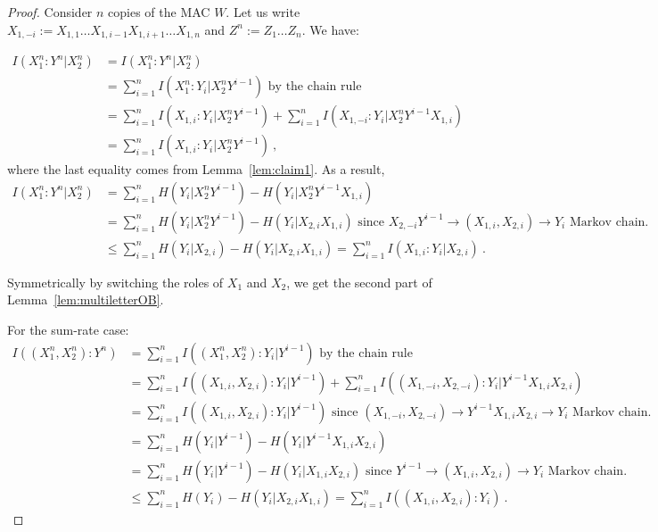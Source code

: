 \documentclass[11pt]{article}
\theoremstyle{definition}
\theoremstyle{remark}
\begin{document}
  \begin{proof}
    Consider $n$ copies of the MAC $W$. Let us write $X_{1,-i} := X_{1,1} \ldots X_{1,i-1} X_{1,i+1} \ldots X_{1,n}$ and $Z^n := Z_1 \ldots Z_n$. We have:

    \begin{equation}
      \begin{aligned}
        I(X_1^n:Y^n|X_2^n) &= I(X_1^n:Y^n|X_2^n)\\
        &= \sum_{i=1}^n I(X_1^n:Y_i|X_2^nY^{i-1}) \text{ by the chain rule}\\
        &= \sum_{i=1}^n I(X_{1,i}:Y_i|X_2^nY^{i-1}) + \sum_{i=1}^n I(X_{1,-i}:Y_i|X_2^nY^{i-1}X_{1,i})\\
        &= \sum_{i=1}^n I(X_{1,i}:Y_i|X_2^nY^{i-1}) \ ,
        \end{aligned}
     \end{equation}
     where the last equality comes from Lemma~\ref{lem:claim1}. As a result,
     \begin{equation}
     \begin{aligned}
        I(X_1^n:Y^n|X_2^n) &= \sum_{i=1}^n H(Y_i|X_2^nY^{i-1}) - H(Y_i|X_2^nY^{i-1}X_{1,i})\\
        &= \sum_{i=1}^n H(Y_i|X_2^nY^{i-1}) - H(Y_i|X_{2,i}X_{1,i}) \text{ since $X_{2,-i} Y^{i-1} \rightarrow (X_{1,i},X_{2,i}) \rightarrow Y_i$ Markov chain.}\\
        &\leq \sum_{i=1}^n H(Y_i|X_{2,i}) - H(Y_i|X_{2,i}X_{1,i}) = \sum_{i=1}^n I(X_{1,i}:Y_i|X_{2,i}) \ .
      \end{aligned}
    \end{equation}
    
      Symmetrically by switching the roles of $X_1$ and $X_2$, we get the second part of Lemma~\ref{lem:multiletterOB}.
      
      For the sum-rate case:
      \begin{equation*}
        \begin{aligned}
          I((X_1^n,X_2^n):Y^n) &= \sum_{i=1}^n I((X_1^n,X_2^n):Y_i|Y^{i-1}) \text{ by the chain rule}\\
          &= \sum_{i=1}^n I((X_{1,i},X_{2,i}):Y_i|Y^{i-1}) + \sum_{i=1}^n I((X_{1,-i},X_{2,-i}):Y_i|Y^{i-1}X_{1,i}X_{2,i})\\
          &= \sum_{i=1}^n I((X_{1,i},X_{2,i}):Y_i|Y^{i-1}) \text{ since $(X_{1,-i},X_{2,-i}) \rightarrow Y^{i-1}X_{1,i}X_{2,i} \rightarrow Y_i$ Markov chain.}\\
          &= \sum_{i=1}^n H(Y_i|Y^{i-1}) - H(Y_i|Y^{i-1}X_{1,i}X_{2,i})\\
          &= \sum_{i=1}^n H(Y_i|Y^{i-1}) - H(Y_i|X_{1,i}X_{2,i}) \text{ since $Y^{i-1} \rightarrow (X_{1,i},X_{2,i}) \rightarrow Y_i$ Markov chain.}\\
          &\leq \sum_{i=1}^n H(Y_i) - H(Y_i|X_{2,i}X_{1,i}) = \sum_{i=1}^n I((X_{1,i},X_{2,i}):Y_i) \ .
        \end{aligned}
      \end{equation*}
      
  \end{proof}
  
\end{document}
